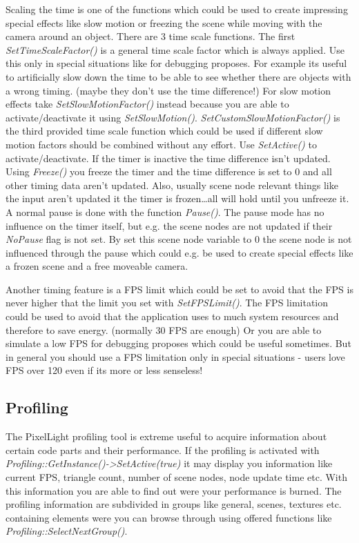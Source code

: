 Scaling the time is one of the functions which could be used to create impressing special effects like slow motion or freezing the scene while moving with the camera around an object. There are 3 time scale functions. The first \emph{SetTimeScaleFactor()} is a general time scale factor which is always applied. Use this only in special situations like for debugging proposes. For example its useful to artificially slow down the time to be able to see whether there are objects with a wrong timing. (maybe they don't use the time difference!) For slow motion effects take \emph{SetSlowMotionFactor()} instead because you are able to activate/deactivate it using \emph{SetSlowMotion()}. \emph{SetCustomSlowMotionFactor()} is the third provided time scale function which could be used if different slow motion factors should be combined without any effort. Use \emph{SetActive()} to activate/deactivate. If the timer is inactive the time difference isn't updated. Using \emph{Freeze()} you freeze the timer and the time difference is set to 0 and all other timing data aren't updated. Also, usually scene node relevant things like the input aren't updated it the timer is frozen\ldots all will hold until you unfreeze it. A normal pause is done with the function \emph{Pause()}. The pause mode has no influence on the timer itself, but e.g. the scene nodes are not updated if their \emph{NoPause} flag is not set. By set this scene node variable to 0 the scene node is not influenced through the pause which could e.g. be used to create special effects like a frozen scene and a free moveable camera.

Another timing feature is a FPS limit which could be set to avoid that the FPS is never higher that the limit you set with \emph{SetFPSLimit()}. The FPS limitation could be used to avoid that the application uses to much system resources and therefore to save energy. (normally 30 FPS are enough) Or you are able to simulate a low FPS for debugging proposes which could be useful sometimes. But in general you should use a FPS limitation only in special situations - users love FPS over 120 even if its more or less senseless!





\subsection{Profiling}
The PixelLight profiling tool is extreme useful to acquire information about certain code parts and their performance. If the profiling is activated with \emph{Profiling::GetInstance()->SetActive(true)} it may display you information like current FPS, triangle count, number of scene nodes, node update time etc. With this information you are able to find out were your performance is burned. The profiling information are subdivided in groups like general, scenes, textures etc. containing elements were you can browse through using offered functions like \emph{Profiling::SelectNextGroup()}.

